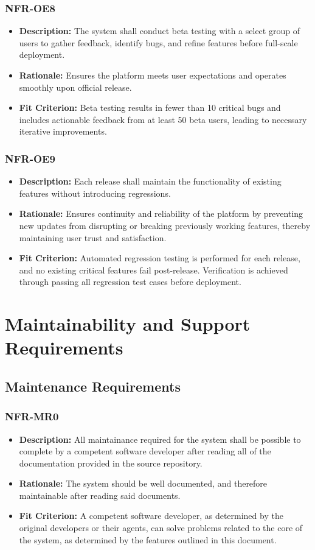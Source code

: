 \documentclass[12pt]{article}
\begin{document}
\subsubsection*{NFR-OE8}
\label{sec:OE8}
\begin{itemize}
  \item \textbf{Description:} The system shall conduct beta testing with a select group of users to gather feedback, identify bugs, and refine features before full-scale deployment.
  \item \textbf{Rationale:} Ensures the platform meets user expectations and operates smoothly upon official release.
  \item \textbf{Fit Criterion:} Beta testing results in fewer than 10 critical bugs and includes actionable feedback from at least 50 beta users, leading to necessary iterative improvements.
\end{itemize}
\subsubsection*{NFR-OE9}
\label{sec:OE9}
\begin{itemize}
  \item \textbf{Description:} Each release shall maintain the functionality of existing features without introducing regressions.
  \item \textbf{Rationale:} Ensures continuity and reliability of the platform by preventing new updates from disrupting or breaking previously working features, thereby maintaining user trust and satisfaction.
  \item \textbf{Fit Criterion:} Automated regression testing is performed for each release, and no existing critical features fail post-release. Verification is achieved through passing all regression test cases before deployment.
\end{itemize}


\section{Maintainability and Support Requirements}
\subsection{Maintenance Requirements}
\subsubsection*{NFR-MR0}
\label{sec:MR0}
\begin{itemize}
  \item \textbf{Description:} All maintainance required for the system shall be possible to complete by a competent software developer after reading all of the documentation provided in the source repository.
  \item \textbf{Rationale:} The system should be well documented, and therefore maintainable after reading said documents.
  \item \textbf{Fit Criterion:} A competent software developer, as determined by the original developers or their agents, can solve problems related to the core of the system, as determined by the 
  features outlined in this document.
\end{itemize}
\end{document}
